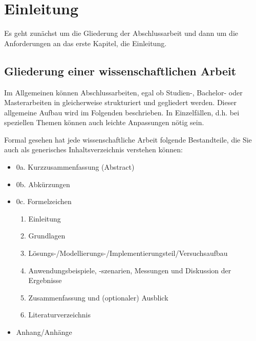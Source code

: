 
\chapter{Einleitung} 
\label{sec:intro}


Es geht zunächst um die Gliederung der Abschlussarbeit und dann um die Anforderungen an das erste Kapitel, die Einleitung. 

\section{Gliederung einer wissenschaftlichen Arbeit}
Im Allgemeinen können Abschlussarbeiten, egal ob Studien-, Bachelor- oder Masterarbeiten in gleicherweise strukturiert und gegliedert werden. Dieser allgemeine Aufbau wird im Folgenden beschrieben. In Einzelfällen, d.h. bei speziellen Themen können auch leichte Anpassungen nötig sein.\par

Formal gesehen hat jede wissenschaftliche Arbeit folgende Bestandteile, die Sie auch als generisches Inhaltsverzeichnis verstehen können:
\begin{itemize}
    \item[] 0a. Kurzzusammenfassung (Abstract)
	\item[] 0b. Abkürzungen
	\item[] 0c. Formelzeichen
    \begin{enumerate}
	    \item Einleitung
	    \item Grundlagen
	    \item Lösungs-/Modellierungs-/Implementierungsteil/Versuchsaufbau
	    \item Anwendungsbeispiele, -szenarien, Messungen und Diskussion der Ergebnisse
	    \item Zusammenfassung und (optionaler) Ausblick
	    \item Literaturverzeichnis
	\end{enumerate}
\item[] Anhang/Anhänge
\end{itemize}

